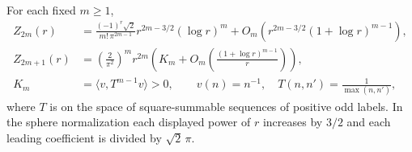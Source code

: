 \begin{theorem}\label{thm:paths}
For each fixed \(m\ge1\),
\begin{align*}
 Z_{2m}(r)
 &=\frac{(-1)^r\sqrt2}{m!\,\pi^{2m-1}}
        r^{2m-3/2}(\log r)^m
     +O_m\!\left(r^{2m-3/2}(1+\log r)^{m-1}\right),\\
 Z_{2m+1}(r)
 &=\left(\frac2{\pi^2}\right)^m r^{2m}
       \left(K_m+O_m\!\left(\frac{(1+\log r)^{m-1}}{r}\right)\right),\\
 K_m&=\langle v,T^{m-1}v\rangle>0,\qquad
      v(n)=n^{-1},\quad T(n,n')=\frac1{\max(n,n')},
\end{align*}
where \(T\) is on the space of square-summable sequences of positive odd labels. In the sphere normalization each displayed power of \(r\) increases by \(3/2\) and each leading coefficient is divided by \(\sqrt2\,\pi\).
\end{theorem}
